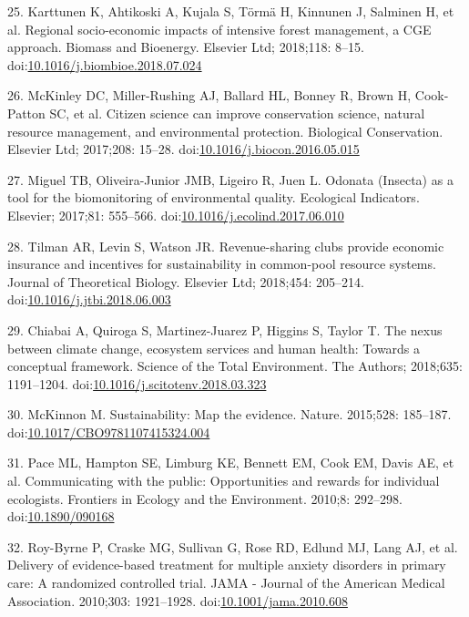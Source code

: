 \documentclass[10pt,letterpaper]{article}
\begin{document}
\hypertarget{ref-Karttunen2018}{}
25. Karttunen K, Ahtikoski A, Kujala S, Törmä H, Kinnunen J, Salminen H,
et al. Regional socio-economic impacts of intensive forest management, a
CGE approach. Biomass and Bioenergy. Elsevier Ltd; 2018;118: 8--15.
doi:\href{https://doi.org/10.1016/j.biombioe.2018.07.024}{10.1016/j.biombioe.2018.07.024}

\hypertarget{ref-McKinley2017}{}
26. McKinley DC, Miller-Rushing AJ, Ballard HL, Bonney R, Brown H,
Cook-Patton SC, et al. Citizen science can improve conservation science,
natural resource management, and environmental protection. Biological
Conservation. Elsevier Ltd; 2017;208: 15--28.
doi:\href{https://doi.org/10.1016/j.biocon.2016.05.015}{10.1016/j.biocon.2016.05.015}

\hypertarget{ref-Miguel2017}{}
27. Miguel TB, Oliveira-Junior JMB, Ligeiro R, Juen L. Odonata (Insecta)
as a tool for the biomonitoring of environmental quality. Ecological
Indicators. Elsevier; 2017;81: 555--566.
doi:\href{https://doi.org/10.1016/j.ecolind.2017.06.010}{10.1016/j.ecolind.2017.06.010}

\hypertarget{ref-Tilman2018}{}
28. Tilman AR, Levin S, Watson JR. Revenue-sharing clubs provide
economic insurance and incentives for sustainability in common-pool
resource systems. Journal of Theoretical Biology. Elsevier Ltd;
2018;454: 205--214.
doi:\href{https://doi.org/10.1016/j.jtbi.2018.06.003}{10.1016/j.jtbi.2018.06.003}

\hypertarget{ref-Chiabai2018}{}
29. Chiabai A, Quiroga S, Martinez-Juarez P, Higgins S, Taylor T. The
nexus between climate change, ecosystem services and human health:
Towards a conceptual framework. Science of the Total Environment. The
Authors; 2018;635: 1191--1204.
doi:\href{https://doi.org/10.1016/j.scitotenv.2018.03.323}{10.1016/j.scitotenv.2018.03.323}

\hypertarget{ref-McKinnon2015}{}
30. McKinnon M. Sustainability: Map the evidence. Nature. 2015;528:
185--187.
doi:\href{https://doi.org/10.1017/CBO9781107415324.004}{10.1017/CBO9781107415324.004}

\hypertarget{ref-Pace2010}{}
31. Pace ML, Hampton SE, Limburg KE, Bennett EM, Cook EM, Davis AE, et
al. Communicating with the public: Opportunities and rewards for
individual ecologists. Frontiers in Ecology and the Environment. 2010;8:
292--298. doi:\href{https://doi.org/10.1890/090168}{10.1890/090168}

\hypertarget{ref-Roy-Byrne2010}{}
32. Roy-Byrne P, Craske MG, Sullivan G, Rose RD, Edlund MJ, Lang AJ, et
al. Delivery of evidence-based treatment for multiple anxiety disorders
in primary care: A randomized controlled trial. JAMA - Journal of the
American Medical Association. 2010;303: 1921--1928.
doi:\href{https://doi.org/10.1001/jama.2010.608}{10.1001/jama.2010.608}
\end{document}
